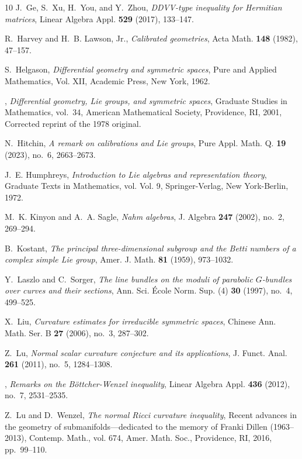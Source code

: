 \begin{thebibliography}{10}
J.~Ge, S.~Xu, H.~You, and Y.~Zhou, \emph{{DDVV}-type inequality for {H}ermitian
  matrices}, Linear Algebra Appl. \textbf{529} (2017), 133--147.

R.~Harvey and H.~B. Lawson, Jr., \emph{Calibrated geometries}, Acta Math.
  \textbf{148} (1982), 47--157.

S.~Helgason, \emph{Differential geometry and symmetric spaces}, Pure and
  Applied Mathematics, Vol. XII, Academic Press, New York, 1962.

\bysame, \emph{Differential geometry, {L}ie groups, and symmetric spaces},
  Graduate Studies in Mathematics, vol.~34, American Mathematical Society,
  Providence, RI, 2001, Corrected reprint of the 1978 original.

N.~Hitchin, \emph{A remark on calibrations and {L}ie groups}, Pure Appl. Math.
  Q. \textbf{19} (2023), no.~6, 2663--2673.

J.~E. Humphreys, \emph{Introduction to {L}ie algebras and representation
  theory}, Graduate Texts in Mathematics, vol. Vol. 9, Springer-Verlag, New
  York-Berlin, 1972.

M.~K. Kinyon and A.~A. Sagle, \emph{Nahm algebras}, J. Algebra \textbf{247}
  (2002), no.~2, 269--294.

B.~Kostant, \emph{The principal three-dimensional subgroup and the {B}etti
  numbers of a complex simple {L}ie group}, Amer. J. Math. \textbf{81} (1959),
  973--1032.

Y.~Laszlo and C.~Sorger, \emph{The line bundles on the moduli of parabolic
  {$G$}-bundles over curves and their sections}, Ann. Sci. \'Ecole Norm. Sup.
  (4) \textbf{30} (1997), no.~4, 499--525.

X.~Liu, \emph{Curvature estimates for irreducible symmetric spaces}, Chinese
  Ann. Math. Ser. B \textbf{27} (2006), no.~3, 287--302.

Z.~Lu, \emph{Normal scalar curvature conjecture and its applications}, J.
  Funct. Anal. \textbf{261} (2011), no.~5, 1284--1308.

\bysame, \emph{Remarks on the {B}\"ottcher-{W}enzel inequality}, Linear Algebra
  Appl. \textbf{436} (2012), no.~7, 2531--2535.

Z.~Lu and D.~Wenzel, \emph{The normal {R}icci curvature inequality}, Recent
  advances in the geometry of submanifolds---dedicated to the memory of
  {F}ranki {D}illen (1963--2013), Contemp. Math., vol. 674, Amer. Math. Soc.,
  Providence, RI, 2016, pp.~99--110.


\end{thebibliography}
